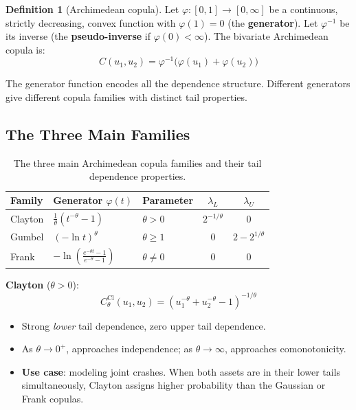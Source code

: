 \documentclass[11pt, a4paper]{article}
\theoremstyle{definition}
\newtheorem{definition}{Definition}[section]
\theoremstyle{plain}
\theoremstyle{remark}
\begin{document}
\begin{definition}[Archimedean copula]
Let $\varphi : [0,1] \to [0, \infty]$ be a continuous, strictly decreasing, convex function
with $\varphi(1) = 0$ (the \textbf{generator}).
Let $\varphi^{-1}$ be its inverse (the \textbf{pseudo-inverse} if $\varphi(0) < \infty$).
The bivariate Archimedean copula is:
\[
    C(u_1, u_2) = \varphi^{-1}\bigl(\varphi(u_1) + \varphi(u_2)\bigr)
\]
\end{definition}

The generator function encodes all the dependence structure.
Different generators give different copula families with distinct tail properties.

\subsection{The Three Main Families}

\begin{table}[H]
\centering
\begin{tabular}{@{}lllcc@{}}
\toprule
\textbf{Family} & \textbf{Generator} $\varphi(t)$ & \textbf{Parameter} & $\lambda_L$ & $\lambda_U$ \\
\midrule
Clayton & $\frac{1}{\theta}(t^{-\theta} - 1)$ & $\theta > 0$ & $2^{-1/\theta}$ & 0 \\[6pt]
Gumbel & $(-\ln t)^\theta$ & $\theta \geq 1$ & 0 & $2 - 2^{1/\theta}$ \\[6pt]
Frank & $-\ln\!\left(\frac{e^{-\theta t} - 1}{e^{-\theta} - 1}\right)$ & $\theta \neq 0$ & 0 & 0 \\
\bottomrule
\end{tabular}
\caption{The three main Archimedean copula families and their tail dependence properties.}
\end{table}

\textbf{Clayton} ($\theta > 0$):
\[
    C_\theta^{\text{Cl}}(u_1, u_2) = \left(u_1^{-\theta} + u_2^{-\theta} - 1\right)^{-1/\theta}
\]
\begin{itemize}
    \item Strong \emph{lower} tail dependence, zero upper tail dependence.
    \item As $\theta \to 0^+$, approaches independence; as $\theta \to \infty$, approaches comonotonicity.
    \item \textbf{Use case}: modeling joint crashes. When both assets are in their lower tails simultaneously, Clayton assigns higher probability than the Gaussian or Frank copulas.
\end{itemize}
\end{document}
